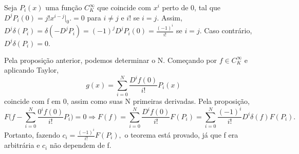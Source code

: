\documentclass[measure_theory.tex]{subfiles}
\begin{document}
\begin{proof*}
	Seja \(P_{i}(x)\) uma função \(C_{K}^{\infty}\) que coincide com \(x^{i}\) perto de 0, tal que \(D^{j}P_{i}(0) = j!x^{i-j}\biggl|_{0}^{}\biggr. =0\) para \(i\neq j\) e \(i!\) se \(i= j\). Assim,
	\(D^{j}\delta (P_{i}) = \delta (-D^{j}P_{i}) = (-1)^{j}D^{j}P_{i}(0) = \frac{(-1)^{i}}{i!}\) se \(i = j\). Caso contrário, \(D^{j}\delta (P_{i}) = 0.\)

	Pela proposição anterior, podemos determinar o N. Começando por \(f\in C_{K}^{\infty}\) e aplicando Taylor,
	\[
		g(x) = \sum\limits_{i=0}^{N}\frac{D^{i}f(0)}{i!}P_{i}(x)
	\]
	coincide com f em 0, assim como suas N primeiras derivadas. Pela proposição,
	\[
		F \biggl(f - \sum\limits_{i=0}^{N}\frac{0^{i}f(0)}{i!}P_{i}\biggr) = 0 \Rightarrow F(f) = \sum\limits_{i=0}^{N}\frac{D^{i}f(0)}{i!}F(P_{i}) = \sum\limits_{i=0}^{N} \frac{(-1)^{i}}{i!}D^{i}\delta (f)F(P_{i}).
	\]
	Portanto, fazendo \(c_{i} = \frac{(-1)^{i}}{i!}F(P_{i}),\) o teorema está provado, já que f era arbitrária e \(c_{i}\) não dependem de f. \qedsymbol
\end{proof*}
\end{document}
